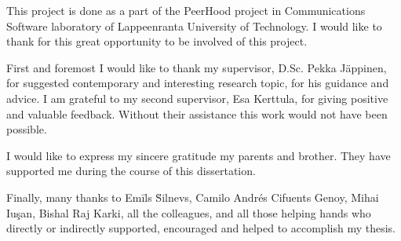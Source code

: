 \Sentence
This project is done as a part of the PeerHood project in Communications Software laboratory of
Lappeenranta University of Technology.
\Sentence
I would like to thank for this great opportunity to be involved of this project.

\Sentence
First and foremost I would like to thank my supervisor, D.Sc. Pekka J\"appinen, for suggested
contemporary and interesting research topic, for his guidance and advice. 
\Sentence
I am grateful to my second supervisor, Esa Kerttula, for giving positive and valuable feedback. 
\Sentence
Without their assistance this work would not have been possible.

\Sentence
I would like to express my sincere gratitude my parents and brother.
\Sentence
They have supported me during the course of this dissertation.

\Sentence
Finally, many thanks to Em\={i}ls \u{S}i\cb l\cb nevs, Camilo Andr\'{e}s
Cifuents Genoy, Mihai Iu\c{s}an, Bishal Raj Karki, all the colleagues, and all those helping hands
who directly or indirectly supported, encouraged and helped to accomplish my thesis.